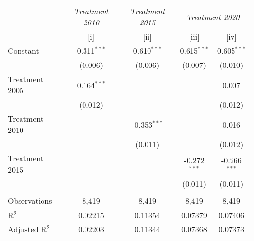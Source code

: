 
\begingroup
\centering
\begin{tabular}{lcccc}
   \toprule
    & \textit{Treatment  2010} & \textit{Treatment 2015} & \multicolumn{2}{c}{\textit{Treatment 2020}}\\
                   & [i]           & [ii]           & [iii]          & [iv]\\  
   \midrule 
   Constant        & 0.311$^{***}$ & 0.610$^{***}$  & 0.615$^{***}$  & 0.605$^{***}$\\   
                   & (0.006)       & (0.006)        & (0.007)        & (0.010)\\   
   Treatment 2005  & 0.164$^{***}$ &                &                & 0.007\\   
                   & (0.012)       &                &                & (0.012)\\   
   Treatment  2010 &               & -0.353$^{***}$ &                & 0.016\\   
                   &               & (0.011)        &                & (0.012)\\   
   Treatment 2015  &               &                & -0.272$^{***}$ & -0.266$^{***}$\\   
                   &               &                & (0.011)        & (0.011)\\   
    \\
   Observations    & 8,419         & 8,419          & 8,419          & 8,419\\  
   R$^2$           & 0.02215       & 0.11354        & 0.07379        & 0.07406\\  
   Adjusted R$^2$  & 0.02203       & 0.11344        & 0.07368        & 0.07373\\  
   \bottomrule
\end{tabular}
\par\endgroup


